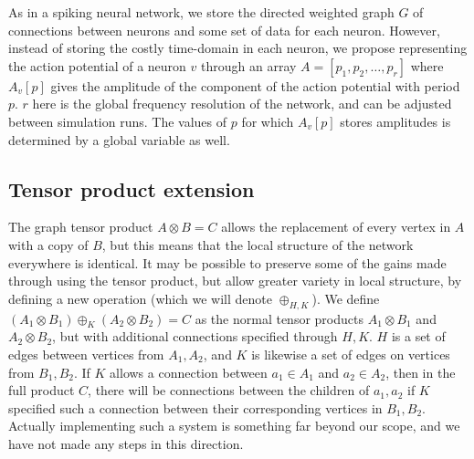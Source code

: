 \documentclass{article}
\begin{document}
As in a spiking neural network, we store the directed weighted graph $G$ of connections between neurons and some set of data for each neuron. However, instead of storing the costly time-domain in each neuron, we propose representing the action potential of a neuron $v$ through an array $A = [p_1, p_2, \ldots, p_r]$ where $A_v[p]$ gives the amplitude of the component of the action potential with period $p$. $r$ here is the global frequency resolution of the network, and can be adjusted between simulation runs. The values of $p$ for which $A_v[p]$ stores amplitudes is determined by a global variable as well. 

\subsection{Tensor product extension}

The graph tensor product $A \otimes B = C$ allows the replacement of every vertex in $A$ with a copy of $B$, but this means that the local structure of the network everywhere is identical. It may be possible to preserve some of the gains made through using the tensor product, but allow greater variety in local structure, by defining a new operation (which we will denote $\oplus_{H,K}$). We define $(A_1 \otimes B_1) \oplus_K (A_2 \otimes B_2) = C$ as the normal tensor products $A_1 \otimes B_1$ and $A_2 \otimes B_2$, but with additional connections specified through $H,K$. $H$ is a set of edges between vertices from $A_1, A_2$, and $K$ is likewise a set of edges on vertices from $B_1, B_2$. If $K$ allows a connection between $a_1 \in A_1$ and $a_2 \in A_2$, then in the full product $C$, there will be connections between the children of $a_1, a_2$ if $K$ specified such a connection between their corresponding vertices in $B_1, B_2$. Actually implementing such a system is something far beyond our scope, and we have not made any steps in this direction.





\newpage
\end{document}
